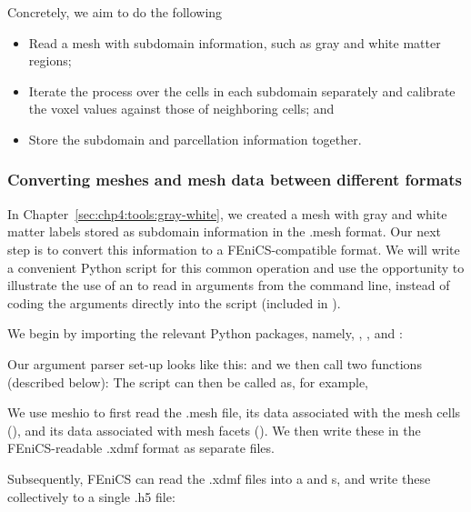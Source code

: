 Concretely, we aim to do the following
\begin{itemize}
\item
  Read a mesh with subdomain information, such as gray and white matter
  regions;
\item
  Iterate the process over the cells in each subdomain separately and calibrate
  the voxel values against those of neighboring cells; and
\item
  Store the subdomain and parcellation information together.
\end{itemize}

\subsubsection*{Converting meshes and mesh data between different formats} 
\label{chp4:meshio-converting}

In Chapter~\ref{sec:chp4:tools:gray-white}, we created a mesh with
gray and white matter labels stored as subdomain information in the
.mesh format. Our next step is to convert this information to a
FEniCS-compatible format. We will write a convenient Python script for this
common operation and use the opportunity to illustrate the use of an
 to read in arguments from the command
line, instead of coding the arguments directly into the script
(included in ).

We begin by importing the relevant Python packages, namely, ,
, and :

\noindent Our argument parser set-up looks like this:
\noindent and we then  call two functions (described below): 
The script can then be called as, for example, 

We use meshio to first read the .mesh file, its data associated with
the mesh cells (), and its data associated with mesh
facets (). We then write these in the FEniCS-readable
.xdmf format as separate files.

Subsequently, FEniCS can read the .xdmf files into a
 and s, and write these
collectively to a single .h5 file:

